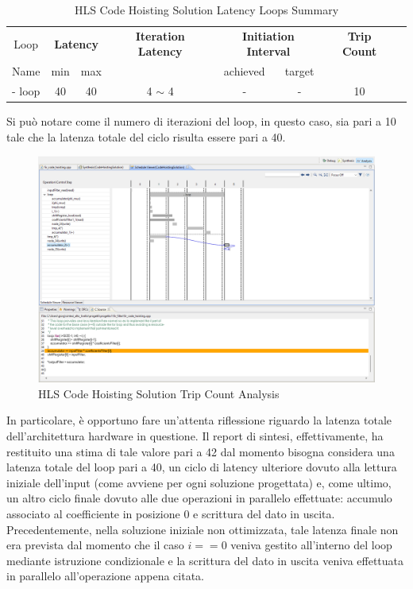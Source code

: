 \begin{table}[H]
    \centering
    \begin{tabular}{|c|c|c|c|c|c|c|c|}
        \hline
        \multicolumn{1}{|c|}{Loop} & \multicolumn{2}{|c|}{\textbf{Latency}} & \multicolumn{1}{c|}{\textbf{Iteration Latency}} & \multicolumn{2}{c|}{\textbf{Initiation Interval}} & \multicolumn{1}{c|}{\textbf{Trip Count}}  \\
        Name & min & max & & achieved & target &  \\
        \hline
        - loop & 40 & 40 & 4 $\sim$ 4 & - & - & 10 \\
        \hline
    \end{tabular}
    \caption{HLS Code Hoisting Solution Latency Loops Summary }
    \label{tab:hls-code-hoisting-solution-loop-summary}
\end{table}

Si può notare come il numero di iterazioni del loop, in questo caso, sia pari a 10 tale che la latenza totale del ciclo risulta essere pari a 40.

\begin{figure}[H]
    \centering
    \includegraphics[width=1\textwidth]{solutions/code_hoisting/codehoistinganalysis.png}
    \caption{HLS Code Hoisting Solution Trip Count Analysis}
\end{figure}

In particolare, è opportuno fare un'attenta riflessione riguardo la latenza totale dell'architettura hardware in questione. Il report di sintesi, effettivamente, ha restituito una stima di tale valore pari a 42 dal momento bisogna considera una latenza totale del loop pari a 40, un ciclo di latency ulteriore dovuto alla lettura iniziale dell'input (come avviene per ogni soluzione progettata) e, come ultimo, un altro ciclo finale dovuto alle due operazioni in parallelo effettuate: accumulo associato al coefficiente in posizione 0 e scrittura del dato in uscita. Precedentemente, nella soluzione iniziale non ottimizzata, tale latenza finale non era prevista dal momento che il caso $i==0$ veniva gestito all'interno del loop mediante istruzione condizionale e la scrittura del dato in uscita veniva effettuata in parallelo all'operazione appena citata.

